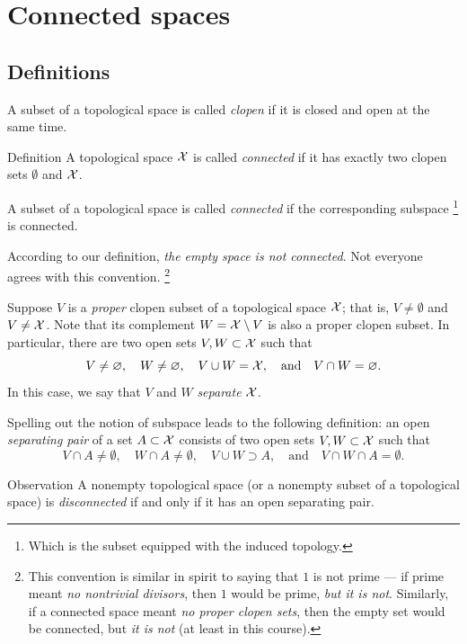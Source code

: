 \chapter{Connected spaces}\label{chap:connect}

\section{Definitions}

A subset of a topological space is called \emph{clopen} if it is closed and open at the same time.

\begin{thm}{Definition}
A topological space $\mathcal{X}$ is called \emph{connected} if it has exactly two clopen sets $\emptyset$ and $\mathcal{X}$.

A subset of a topological space is called \emph{connected} if the corresponding subspace%
\footnote{Which is the subset equipped with the induced topology.}
is connected.
\end{thm}

According to our definition, \textit{the empty space is not connected}.
Not everyone agrees with this convention.%
\footnote{This convention is similar in spirit to saying that $1$ is not prime --- if prime meant \textit{no nontrivial divisors}, then $1$ would be prime, \textit{but it is not}.
Similarly, if a connected space meant \textit{no proper clopen sets}, then the empty set would be connected, but \textit{it is not} (at least in this course).
}

Suppose $V$ is a \emph{proper} clopen subset of a topological space $\mathcal{X}$;
that is, $V\ne\emptyset$ and $V\ne\mathcal{X}$.
Note that its complement $W=\mathcal{X}\setminus V$ is also a proper clopen subset.
In particular, there are two open sets $V,W\subset \mathcal{X}$ such that
\[V\ne\varnothing,
\quad
W\ne\varnothing,
\quad
V\cup W=\mathcal{X},
\quad\text{and}\quad
V\cap W=\varnothing.\]
In this case, we say that $V$ and $W$ \emph{separate} $\mathcal{X}$.

Spelling out the notion of subspace leads to the following definition:
an open {}\emph{separating pair} of a set $A\subset\mathcal{X}$ consists of two open sets $V,W\subset \mathcal{X}$ such that
\[V\cap A\ne\emptyset,\quad
W\cap A\ne\emptyset,\quad
V\cup W\supset A,\quad\text{and}\quad
V\cap W\cap A=\emptyset.\]

\begin{thm}{Observation}\label{def:connected-subset}
A nonempty topological space (or a nonempty subset of a topological space) is \emph{disconnected} if and only if it has an open separating pair.
\end{thm}

